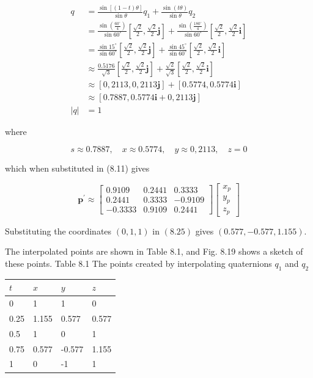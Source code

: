 \documentclass[10pt]{article}
\begin{document}
$$
\begin{aligned}
q & =\frac{\sin [(1-t) \theta]}{\sin \theta} q_{1}+\frac{\sin (t \theta)}{\sin \theta} q_{2} \\
& =\frac{\sin \left(\frac{60^{\circ}}{4}\right)}{\sin 60^{\circ}}\left[\frac{\sqrt{2}}{2}, \frac{\sqrt{2}}{2} \mathbf{j}\right]+\frac{\sin \left(\frac{180^{\circ}}{4}\right)}{\sin 60^{\circ}}\left[\frac{\sqrt{2}}{2}, \frac{\sqrt{2}}{2} \mathbf{i}\right] \\
& =\frac{\sin 15^{\circ}}{\sin 60^{\circ}}\left[\frac{\sqrt{2}}{2}, \frac{\sqrt{2}}{2} \mathbf{j}\right]+\frac{\sin 45^{\circ}}{\sin 60^{\circ}}\left[\frac{\sqrt{2}}{2}, \frac{\sqrt{2}}{2} \mathbf{i}\right] \\
& \approx \frac{0.5176}{\sqrt{3}}\left[\frac{\sqrt{2}}{2}, \frac{\sqrt{2}}{2} \mathbf{j}\right]+\frac{\sqrt{2}}{\sqrt{3}}\left[\frac{\sqrt{2}}{2}, \frac{\sqrt{2}}{2} \mathbf{i}\right] \\
& \approx[0,2113,0,2113 \mathbf{j}]+[0.5774,0.5774 \mathbf{i}] \\
& \approx[0.7887,0.5774 \mathbf{i}+0,2113 \mathbf{j}] \\
|q| & =1
\end{aligned}
$$

where

$$
s \approx 0.7887, \quad x \approx 0.5774, \quad y \approx 0,2113, \quad z=0
$$

which when substituted in (8.11) gives

$$
\mathbf{p}^{\prime} \approx\left[\begin{array}{ccc}
0.9109 & 0.2441 & 0.3333 \\
0.2441 & 0.3333 & -0.9109 \\
-0.3333 & 0.9109 & 0.2441
\end{array}\right]\left[\begin{array}{l}
x_{p} \\
y_{p} \\
z_{p}
\end{array}\right]
$$

Substituting the coordinates $(0,1,1)$ in $(8.25)$ gives $(0.577,-0.577,1.155)$.

The interpolated points are shown in Table 8.1, and Fig. 8.19 shows a sketch of these points. Table 8.1 The points created by interpolating quaternions $q_{1}$ and $q_{2}$

\begin{center}
\begin{tabular}{l|l|l|l}
\hline
$t$ & $x$ & $y$ & $z$ \\
\hline
0 & 1 & 1 & 0 \\
\hline
0.25 & 1.155 & 0.577 & 0.577 \\
\hline
0.5 & 1 & 0 & 1 \\
\hline
0.75 & 0.577 & -0.577 & 1.155 \\
\hline
1 & 0 & -1 & 1 \\
\hline
\end{tabular}
\end{center}
\end{document}

